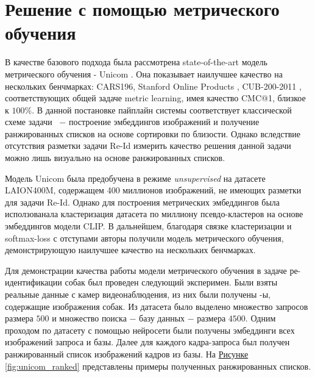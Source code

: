 \section{Решение с помощью метрического обучения}

В качестве базового подхода была рассмотрена state-of-the-art модель метрического обучения - Unicom \cite{an2023unicom}. Она показывает наилучшее качество на нескольких бенчмарках: CARS196, Stanford Online Products \cite{oh2016deep}, CUB-200-2011 \cite{wah2011caltech}, соответствующих общей задаче metric learning, имея качество CMC@1, близкое к $100 \%$. В данной постановке пайплайн системы соответствует классической схеме задачи \reid\ $-$ построение эмбеддингов изображений и получение ранжированных списков на основе сортировки по близости. Однако вследствие отсутствия разметки задачи Re-Id измерить качество решения данной задачи можно лишь визуально на основе ранжированных списков.

Модель Unicom была предобучена в режиме \textit{unsupervised} на датасете LAION400M, содержащем 400 миллионов изображений, не имеющих разметки для задачи Re-Id. Однако для построения метрических эмбеддингов была исползованала кластеризация датасета по миллиону псевдо-кластеров на основе эмбеддингов модели CLIP. В дальнейшем, благодаря связке кластеризации и softmax-loss с отступами авторы получили модель метрического обучения, демонстрирующую наилучшее качество на нескольких бенчмарках.

Для демонстрации качества работы модели метрического обучения в задаче ре-идентификации собак был проведен следующий эксперимен. Были взяты реальные данные с камер видеонаблюдения, из них были получены \bbox-ы, содержащие изображения собак. Из датасета было выделено множество запросов размера $500$ и множество поиска $-$ базу данных $-$ размера $4 500$. Одним проходом по датасету с помощью нейросети были получены эмбеддинги всех изображений запроса и базы. Далее для каждого кадра-запроса был получен ранжированный список изображений кадров из базы. На \hyperref[fig:unicom_ranked]{Рисунке \ref*{fig:unicom_ranked}} представлены примеры полученных ранжированных списков.

